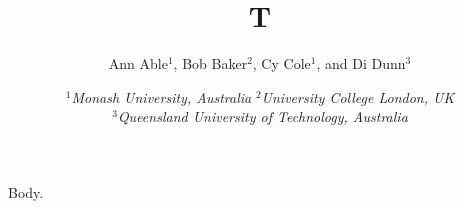 \documentclass{article}
\begin{document}
\title{T}
\author{Ann Able$^{1}$, Bob Baker$^{2}$, Cy Cole$^{1}$, and Di Dunn$^{3}$}
\date{\normalsize
$^1$\textit{Monash University, Australia}
\newline $^2$\textit{University College London, UK}
\\
$^3$\textit{Queensland University of Technology, Australia}}
\maketitle
Body.
\end{document}
